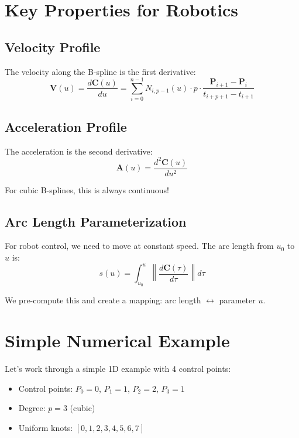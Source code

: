 \documentclass[12pt,a4paper]{article}
\begin{document}
\section{Key Properties for Robotics}

\subsection{Velocity Profile}

The velocity along the B-spline is the first derivative:
\begin{equation}
    \mathbf{V}(u) = \frac{d\mathbf{C}(u)}{du} = \sum_{i=0}^{n-1} N_{i,p-1}(u) \cdot p \cdot \frac{\mathbf{P}_{i+1} - \mathbf{P}_i}{t_{i+p+1} - t_{i+1}}
\end{equation}

\subsection{Acceleration Profile}

The acceleration is the second derivative:
\begin{equation}
    \mathbf{A}(u) = \frac{d^2\mathbf{C}(u)}{du^2}
\end{equation}

For cubic B-splines, this is always continuous!

\subsection{Arc Length Parameterization}

For robot control, we need to move at constant speed. The arc length from $u_0$ to $u$ is:
\begin{equation}
    s(u) = \int_{u_0}^{u} \left\| \frac{d\mathbf{C}(\tau)}{d\tau} \right\| d\tau
\end{equation}

We pre-compute this and create a mapping: arc length $\leftrightarrow$ parameter $u$.

\section{Simple Numerical Example}

Let's work through a simple 1D example with 4 control points:

\begin{itemize}
    \item Control points: $P_0 = 0$, $P_1 = 1$, $P_2 = 2$, $P_3 = 1$
    \item Degree: $p = 3$ (cubic)
    \item Uniform knots: $[0, 1, 2, 3, 4, 5, 6, 7]$
\end{itemize}
\end{document}
